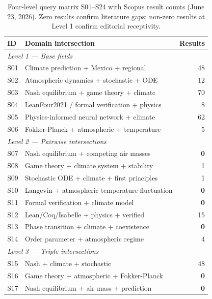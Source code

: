 \documentclass[12pt,a4paper]{article}
\begin{document}
\begin{table}[ht]
\centering
\caption{Four-level query matrix S01--S24 with Scopus result counts
(June 23, 2026). Zero results confirm literature gaps; non-zero results
at Level 1 confirm editorial receptivity.}
\label{tab:queries}
\small
\begin{tabular}{llr}
\hline
\textbf{ID} & \textbf{Domain intersection} & \textbf{Results} \\
\hline
\multicolumn{3}{l}{\textit{Level 1 — Base fields}} \\
S01 & Climate prediction + Mexico + regional          &  48 \\
S02 & Atmospheric dynamics + stochastic + ODE         &  12 \\
S03 & Nash equilibrium + game theory + climate        &  70 \\
S04 & LeanFour2021 / formal verification + physics           &   8 \\
S05 & Physics-informed neural network + climate       &  62 \\
S06 & Fokker-Planck + atmospheric + temperature       &   5 \\
\hline
\multicolumn{3}{l}{\textit{Level 2 — Pairwise intersections}} \\
S07 & Nash equilibrium + competing air masses         &   \textbf{0} \\
S08 & Game theory + climate system + stability        &   1 \\
S09 & Stochastic ODE + climate + first principles     &   1 \\
S10 & Langevin + atmospheric temperature fluctuation  &   \textbf{0} \\
S11 & Formal verification + climate model             &   \textbf{0} \\
S12 & Lean/Coq/Isabelle + physics + verified          &  15 \\
S13 & Phase transition + climate + coexistence        &   \textbf{0} \\
S14 & Order parameter + atmospheric regime            &   4 \\
\hline
\multicolumn{3}{l}{\textit{Level 3 — Triple intersections}} \\
S15 & Nash + climate + stochastic                     &  48 \\
S16 & Game theory + atmospheric + Fokker-Planck       &   \textbf{0} \\
S17 & Nash equilibrium + air mass + prediction        &   \textbf{0} \\

\end{tabular}
\end{table}
\end{document}
